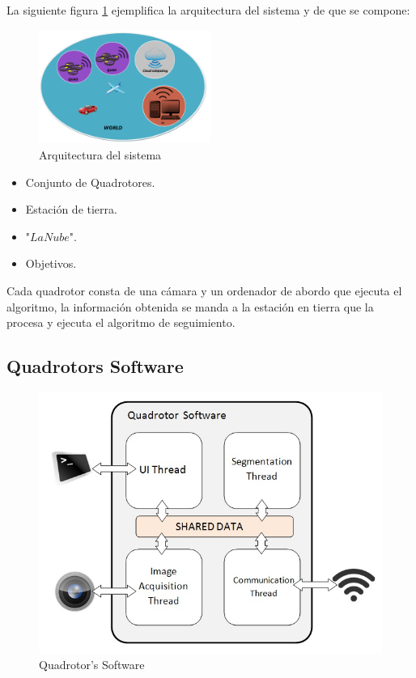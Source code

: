 La siguiente figura \ref{fig:System_Architecture} ejemplifica la arquitectura del sistema y de que se compone: \\
\begin{figure}[th]
	\centering
	\includegraphics[width=0.50\textwidth,natwidth=220,natheight=1467]{../Images/c2/Architecture.png}
	\caption{Arquitectura del sistema}
	\label{fig:System_Architecture}
\end{figure}


\begin{itemize}
  \item Conjunto de Quadrotores.
  \item Estaci\'on de tierra.
  \item "$La Nube$".
  \item Objetivos.
\end{itemize}

Cada quadrotor consta de una c\'amara y un ordenador de abordo que ejecuta el algoritmo, la informaci\'on obtenida se manda a la estaci\'on en tierra que la procesa y ejecuta el algoritmo de seguimiento.

\newpage
\subsection{Quadrotors Software}

	\begin{figure}[hp]
		\begin{center}
			\includegraphics[width=0.7\linewidth]{../Images/c2/Quadsoftware}
		\end{center}
		\caption{Quadrotor's Software}
		\label{fig:Quadsoftware}
	\end{figure}


